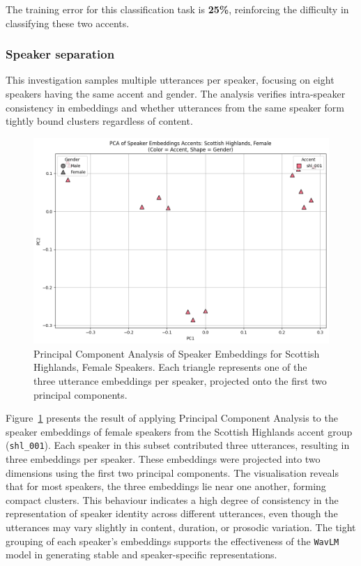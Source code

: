 \documentclass[conference]{IEEEtran}
\begin{document}
	The training error for this classification task is \textbf{25\%}, reinforcing the difficulty in classifying these two accents.
	
	\bigskip
	
	\subsubsection{Speaker separation}
	
	This investigation samples multiple utterances per speaker, focusing on eight speakers having the same accent and gender. The analysis verifies intra-speaker consistency in embeddings and whether utterances from the same speaker form tightly bound clusters regardless of content.
	
	\begin{figure}[h]
		\centering
		\includegraphics[width=1\linewidth]{img/img-cluster-speaker-separation.png}
		\caption{Principal Component Analysis of Speaker Embeddings for Scottish Highlands, Female Speakers. Each triangle represents one of the three utterance embeddings per speaker, projected onto the first two principal components.}
		\label{fig:pca-shl-female}
	\end{figure}
	
	Figure~\ref{fig:pca-shl-female} presents the result of applying Principal Component Analysis to the speaker embeddings of female speakers from the Scottish Highlands accent group (\texttt{shl\_001}). Each speaker in this subset contributed three utterances, resulting in three embeddings per speaker. These embeddings were projected into two dimensions using the first two principal components. The visualisation reveals that for most speakers, the three embeddings lie near one another, forming compact clusters. This behaviour indicates a high degree of consistency in the representation of speaker identity across different utterances, even though the utterances may vary slightly in content, duration, or prosodic variation. The tight grouping of each speaker's embeddings supports the effectiveness of the \texttt{WavLM} model in generating stable and speaker-specific representations.
	
\end{document}
